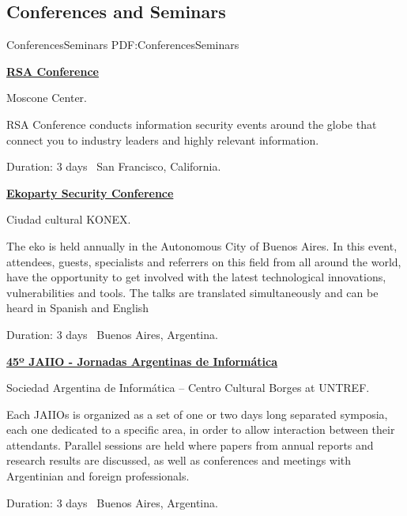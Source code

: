\documentclass[letterpaper,MMMyyyy,nonstop]{simpleresumecv}
\begin{document}
\begin{body}

\section{Conferences\newline 
	and Seminars}
{ConferencesSeminars}
{PDF:ConferencesSeminars}

\href{https://www.rsaconference.com/events/us18}{\textbf{RSA Conference}}
\hfill
{}

\BulletItem Moscone Center.
\begin{detail}
	\SubBulletItem
	RSA Conference conducts information security events around the globe that connect you to industry leaders and highly relevant information.
\end{detail}
Duration: 3 days \SubBulletSymbol\, San Francisco, California.

\BigGap

\href{https://www.ekoparty.org/acerca-ekoparty.php}{\textbf{Ekoparty Security Conference}}
\hfill
{}

\BulletItem Ciudad cultural KONEX.
\begin{detail}
	\SubBulletItem
	The eko is held annually in the Autonomous City of Buenos Aires. In this event, attendees, guests, specialists and referrers on this field from all around the world, have the opportunity to get involved with the latest technological innovations, vulnerabilities and tools. The talks are translated simultaneously and can be heard in Spanish and English
\end{detail}
Duration: 3 days \SubBulletSymbol\, Buenos Aires, Argentina.

\BigGap

\href{http://45jaiio.sadio.org.ar/}{\textbf{45º JAIIO - Jornadas Argentinas de Informática}}
\hfill
{}

\BulletItem Sociedad Argentina de Informática – Centro Cultural Borges at UNTREF.
\begin{detail}
	\SubBulletItem
	Each JAIIOs is organized as a set of one or two days long separated symposia, each one dedicated to a specific area, in order to allow interaction between their attendants. Parallel sessions are held where papers from annual reports and research results are discussed, as well as conferences and meetings with Argentinian and foreign professionals.
\end{detail}
Duration: 3 days \SubBulletSymbol\, Buenos Aires, Argentina.


\end{body}
\end{document}
